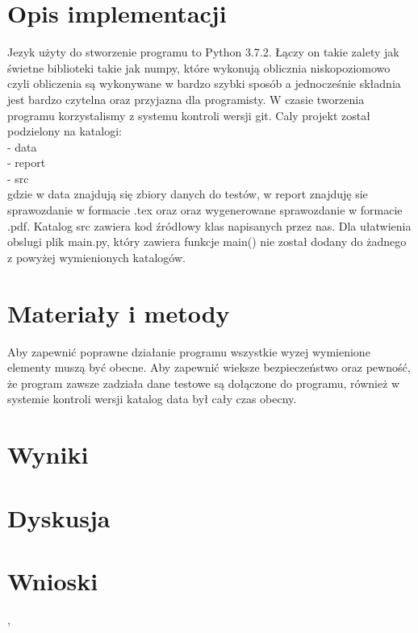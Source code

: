 \documentclass{classrep}
\begin{document}
\section{Opis implementacji}
{Jezyk użyty do stworzenie programu to Python 3.7.2. Łączy on takie zalety jak świetne biblioteki takie jak numpy, które wykonują oblicznia niskopoziomowo czyli obliczenia są wykonywane w bardzo szybki sposób a jednocześnie składnia jest bardzo czytelna oraz przyjazna dla programisty. W czasie tworzenia programu korzystalismy z systemu kontroli wersji git. Caly projekt został podzielony na katalogi:\\
- data\\
- report\\
- src\\
gdzie w data znajdują się zbiory danych do testów, w report znajduję sie sprawozdanie w formacie .tex oraz oraz wygenerowane sprawozdanie w formacie .pdf. Katalog src zawiera kod źródłowy klas napisanych przez nas. Dla ułatwienia obslugi plik main.py, który zawiera funkcje main() nie został dodany do żadnego z powyżej wymienionych katalogów.
}

\section{Materiały i metody}
{Aby zapewnić poprawne działanie programu wszystkie wyzej wymienione elementy muszą być obecne. Aby zapewnić wieksze bezpieczeństwo oraz pewność, że program zawsze zadziała dane testowe są dołączone do programu, również w systemie kontroli wersji katalog data był cały czas obecny.
}

\section{Wyniki}
{

}

\section{Dyskusja}
{

}

\section{Wnioski}
{

}

\begin{thebibliography}{0}
    \textsl{ }, 

\end{thebibliography}

{

}
\end{document}
